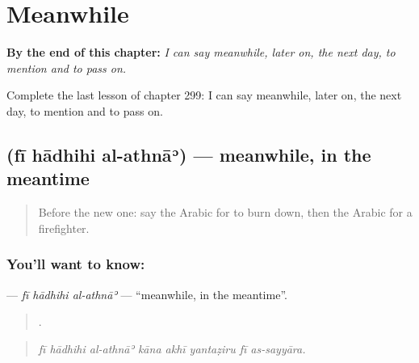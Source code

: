
\chapter{Meanwhile}
\label{ch:ar-meanwhile}

\begin{chapteropening}
\textbf{By the end of this chapter:} \emph{I can say meanwhile, later on, the next day, to mention and to pass on.}

Complete the last lesson of chapter 299: I can say meanwhile, later on, the next day, to mention and to pass on.
\end{chapteropening}

\section[\texorpdfstring{\ar{في} \ar{هذه} \ar{الأثناء} (fī hādhihi al-athnāʾ)}{في هذه الأثناء (fī hādhihi al-athnāʾ)}]{   (fī hādhihi al-athnāʾ) — meanwhile, in the meantime}

\label{lesson:AR-C299-fi-hadhihi-al-athna}



\begin{quote}
Before the new one: say the Arabic for to burn down, then the Arabic for a firefighter.
\end{quote}

\subsection*{You'll want to know:   }
\textbf{  } — \emph{fī hādhihi al-athnāʾ} — \textquotedblleft{}meanwhile, in the meantime\textquotedblright{}.

\begin{quote}
       .
\end{quote}

\begin{quote}
\emph{fī hādhihi al-athnāʾ kāna akhī yantaẓiru fī as-sayyāra.}
\end{quote}

